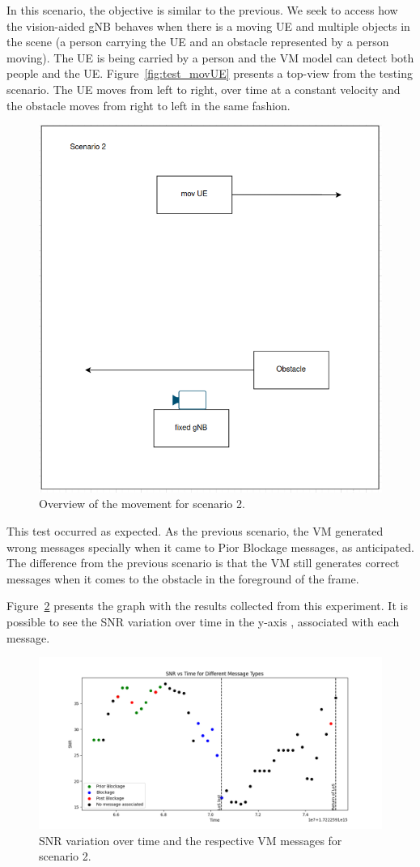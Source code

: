In this scenario, the objective is similar to the previous.
We seek to access how the vision-aided gNB behaves when there is a moving UE and multiple objects in the scene (a person carrying the UE and an obstacle represented by a person moving)\@.
The UE is being carried by a person and the VM model can detect both people and the UE\@.
Figure~\ref{fig:test_movUE} presents a top-view from the testing scenario.
The UE moves from left to right, over time at a constant velocity and the obstacle moves from right to left in the same fashion.

\begin{figure}[H]
    \centering
    \includegraphics[width=0.5\linewidth]{figures/scenario2}
    \caption{Overview of the movement for scenario 2.}
    \label{fig:test_movUE_obst}
\end{figure}

This test occurred as expected.
As the previous scenario, the VM generated wrong messages specially when it came to Pior Blockage messages, as anticipated.
The difference from the previous scenario is that the VM still generates correct messages when it comes to the obstacle in the foreground of the frame.


Figure~\ref{fig:results_2} presents the graph with the results collected from this experiment.
It is possible to see the SNR variation over time in the y-axis , associated with each message.


\begin{figure}[H]
    \centering
    \includegraphics[width=\linewidth]{figures/results_2}
    \caption{SNR variation over time and the respective VM messages for scenario 2.}
    \label{fig:results_2}
\end{figure}

